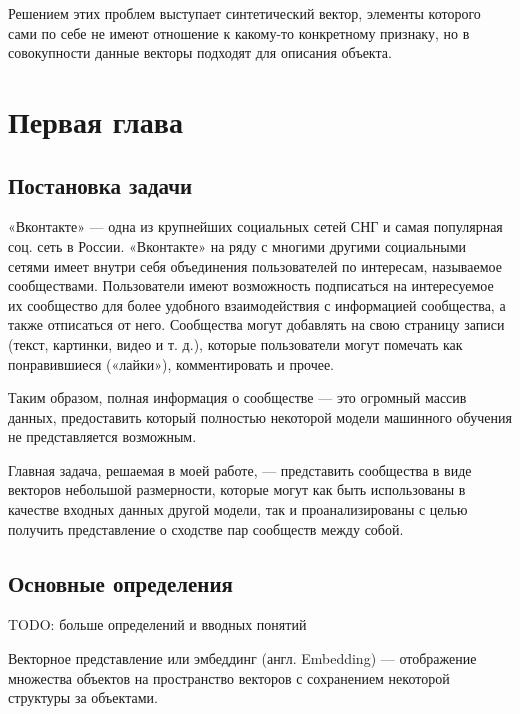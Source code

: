 \documentclass[times,specification,annotation]{itmo-student-thesis}
\begin{document}
Решением этих проблем выступает синтетический вектор, элементы
которого сами по себе не имеют отношение к какому-то конкретному признаку, но
в совокупности данные векторы подходят для описания объекта.

\chapter{Первая глава}


\section{Постановка задачи}\label{sec:intro}

«Вконтакте» — одна из крупнейших социальных сетей СНГ и самая
популярная соц. сеть в России. «Вконтакте» на ряду с многими другими
социальными сетями имеет внутри себя объединения пользователей по интересам,
называемое сообществами. Пользователи имеют возможность подписаться на
интересуемое их сообщество для более удобного взаимодействия с информацией
сообщества, а также отписаться от него. Сообщества могут добавлять на свою
страницу записи (текст, картинки, видео и т. д.), которые пользователи могут
помечать как понравившиеся («лайки»), комментировать и прочее.

Таким образом, полная информация о сообществе — это огромный массив
данных, предоставить который полностью некоторой модели машинного обучения
не представляется возможным.

Главная задача, решаемая в моей работе, — представить сообщества в виде
векторов небольшой размерности, которые могут как быть использованы в
качестве входных данных другой модели, так и проанализированы с целью
получить представление о сходстве пар сообществ между собой.

\section{Основные определения}

TODO: больше определений и вводных понятий

Векторное представление или эмбеддинг (англ. Embedding) — отображение
множества объектов на пространство векторов с сохранением некоторой
структуры за объектами.
\end{document}
